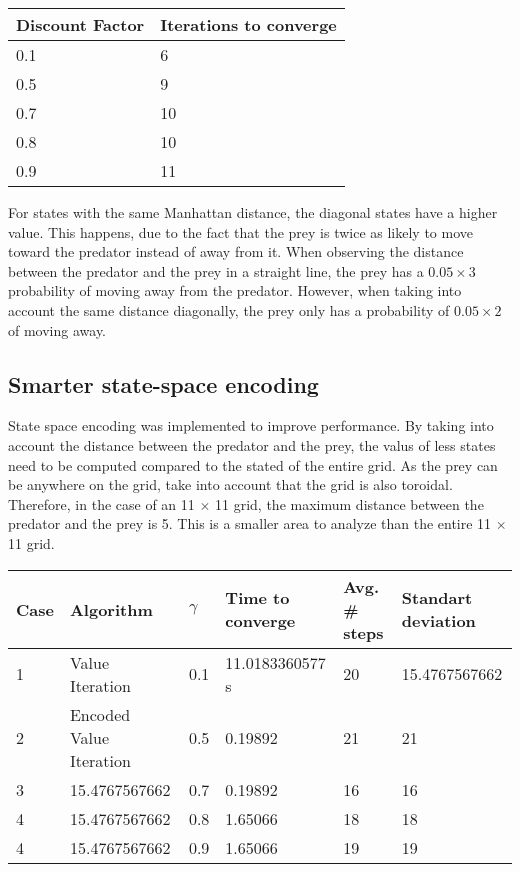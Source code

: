 \documentclass{article}
\begin{document}
\begin{center}
	\begin{tabular}{ l || l }
		Discount Factor & Iterations to converge \\ 
		\hline
		0.1 & 6 \\
		0.5 & 9 \\
		0.7 & 10 \\
		0.8 & 10 \\
		0.9 & 11 \\	
	\end{tabular}
\end{center}

For states with the same Manhattan distance, the diagonal states have a higher value. This happens, due to the fact that the prey is twice as likely to move toward the predator instead of away from it. When observing the distance between the predator and the prey in a straight line, the prey has a $0.05 \times 3$ probability of moving away from the predator. However, when taking into account the same distance diagonally, the prey only has a probability of $0.05 \times 2$ of moving away.

\subsection*{Smarter state-space encoding}
State space encoding was implemented to improve performance. By taking into account the distance between the predator and the prey, the valus of less states need to be computed compared to the stated of the entire grid. As the prey can be anywhere on the grid, take into account that the grid is also toroidal. Therefore, in the case of an 11 $\times$ 11 grid, the maximum distance between the predator and the prey is 5. This is a smaller area to analyze than the entire 11 $\times$ 11 grid.




\begin{center}
	\begin{tabular}{ |l | l | l | l | l | l| }
		Case & Algorithm & $\gamma$ & Time to converge & Avg. \# steps & Standart deviation \\ 
		\hline
		1  & Value Iteration & 0.1 & 11.0183360577 s & 20 & 15.4767567662 \\
		2  & Encoded Value Iteration & 0.5 & 0.19892 & 21 & 21 \\
		3  & 15.4767567662 & 0.7 & 0.19892 & 16 & 16 \\
		4  & 15.4767567662 & 0.8 & 1.65066 & 18 & 18 \\	
		4  & 15.4767567662 & 0.9 & 1.65066 & 19 & 19 \\	
	\end{tabular}
\end{center}
\end{document}
